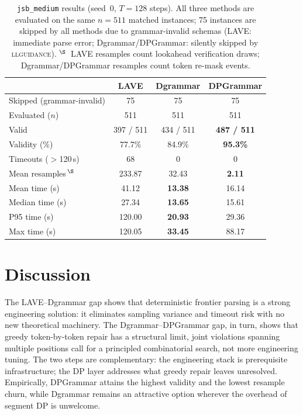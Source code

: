 \begin{table}[t]
\centering
\small
\setlength{\tabcolsep}{8pt}
\begin{tabular}{lccc}
  \toprule
    & LAVE & Dgrammar & DPGrammar \\
  \midrule
  Skipped (grammar-invalid)                    & 75 & 75 & 75 \\
  Evaluated ($n$)                              & 511 & 511 & 511 \\
  \midrule
  Valid                                        & 397 / 511 & 434 / 511 & \textbf{487 / 511} \\
  Validity (\%)                                & 77.7\% & 84.9\% & \textbf{95.3\%} \\
  Timeouts ($>$120\,s)                         & 68 & 0 & 0 \\
  Mean resamples\,$^\S$                        & 233.87 & 32.43 & \textbf{2.11} \\
  \midrule
  Mean time (s)                                & 41.12 & \textbf{13.38} & 16.14 \\
  Median time (s)                              & 27.34 & \textbf{13.65} & 15.61 \\
  P95 time (s)                                 & 120.00 & \textbf{20.93} & 29.36 \\
  Max time (s)                                 & 120.05 & \textbf{33.45} & 88.17 \\
  \bottomrule
\end{tabular}
\caption{\label{tab:main}%
  \texttt{jsb\_medium} results (seed~0, $T{=}128$ steps).
  All three methods are evaluated on the same $n{=}511$ matched instances;
  75 instances are skipped by all methods due to grammar-invalid schemas
  (LAVE: immediate parse error; Dgrammar/DPGrammar: silently skipped by \textsc{llguidance}).
  $^\S$~LAVE resamples count lookahead verification draws; Dgrammar/DPGrammar resamples count token re-mask events.}
\end{table}

\section{Discussion}

The LAVE–Dgrammar gap shows that deterministic frontier parsing is a strong engineering solution: it eliminates sampling variance and timeout risk with no new theoretical machinery. The Dgrammar–DPGrammar gap, in turn, shows that greedy token-by-token repair has a structural limit, joint violations spanning multiple positions call for a principled combinatorial search, not more engineering tuning. The two steps are complementary: the engineering stack is prerequisite infrastructure; the DP layer addresses what greedy repair leaves unresolved. Empirically, DPGrammar attains the highest validity and the lowest resample churn, while Dgrammar remains an attractive option wherever the overhead of segment DP is unwelcome.


